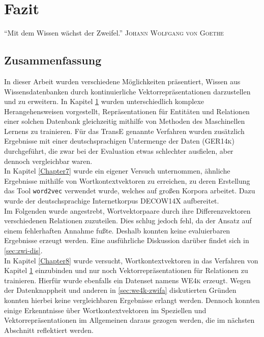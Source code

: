 
\chapter{Fazit} %

\label{Chapter6} %


\begin{itquote}
  ``Mit dem Wissen wächst der Zweifel.''
  \flushright
  \textsc{Johann Wolfgang von Goethe}
\end{itquote}

\section{Zusammenfassung}

In dieser Arbeit wurden verschiedene Möglichkeiten präsentiert, Wissen aus Wissensdatenbanken durch kontinuierliche Vektorrepräsentationen
darzustellen und zu erweitern. In Kapitel \ref{Chapter6} wurden unterschiedlich komplexe Herangehensweisen vorgestellt, Repräsentationen
für Entitäten und Relationen einer solchen Datenbank gleichzeitig mithilfe von Methoden des Maschinellen Lernens zu trainieren.
Für das TransE genannte Verfahren wurden zusätzlich Ergebnisse mit einer deutschsprachigen Untermenge der Daten (\textsc{GER14k})
durchgeführt, die zwar bei der Evaluation etwas schlechter ausfielen, aber dennoch vergleichbar waren.\\

In Kapitel \ref{Chapter7} wurde ein eigener Versuch unternommen, ähnliche Ergebnisse mithilfe von Wortkontextvektoren
zu erreichen, zu deren Erstellung das Tool \verb|word2vec| verwendet wurde, welches auf großen Korpora arbeitet. Dazu
wurde der deutschsprachige Internetkorpus \textsc{DECOW14X} aufbereitet.\\
Im Folgenden wurde angestrebt, Wortvektorpaare durch ihre Differenzvektoren verschiedenen Relationen zuzuteilen. Dies schlug
jedoch fehl, da der Ansatz auf einem fehlerhaften Annahme fußte. Deshalb konnten keine evaluierbaren Ergebnisse erzeugt werden.
Eine ausführliche Diskussion darüber findet sich in \ref{sec:zwi-dis}.\\

In Kapitel \ref{Chapter8} wurde versucht, Wortkontextvektoren in das Verfahren von Kapitel \ref{Chapter6} einzubinden und nur
noch Vektorrepräsentationen für Relationen zu trainieren. Hierfür wurde ebenfalls ein Datenset namens \textsc{WE4k}
erzeugt. Wegen der Datenknappheit und anderen in \ref{sec:we4k-zwifa} diskutierten Gründen konnten hierbei keine vergleichbaren Ergebnisse
erlangt werden. Dennoch konnten einige Erkenntnisse über Wortkontextvektoren im Speziellen und Vektorrepräsentationen
im Allgemeinen daraus gezogen werden, die im nächsten Abschnitt reflektiert werden.

